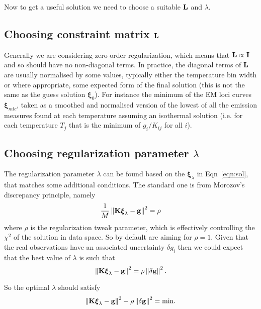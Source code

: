 \documentclass[12pt,a4paper]{article}
\begin{document}
Now to get a useful solution we need to choose a suitable ${\bf L}$ and $\lambda$.

\newpage
\vspace{-10pt}
\subsection*{Choosing constraint matrix ${\bf L}$}

Generally we are considering zero order regularization, which means that ${\bf L} \propto {\bf I}$ and so should have no non-diagonal terms. In practice, the diagonal terms of ${\bf L}$ are usually normalised by some values, typically either the temperature bin width or where appropriate, some expected form of the final solution (this is not the same as the guess solution $\boldsymbol{\xi}_0$). For instance the minimum of the EM loci curves $\boldsymbol{\xi}_{mlc}$, taken as a smoothed and normalised version of the lowest of all the emission measures found at each temperature assuming an isothermal solution (i.e. for each temperature $T_j$ that is the minimum of $g_i/K_{ij}$ for all $i$).


\vspace{-10pt}
\subsection*{Choosing regularization parameter $\lambda$}

The regularization parameter $\lambda$ can be found based on the $\boldsymbol{\xi}_\lambda$ in Eqn~\ref{eqn:sol}, that matches some additional conditions. The standard one is from Morozov's discrepancy principle, namely
\begin{equation}
    \frac{1}{M}\left\|\bf{K\boldsymbol{\xi}_\lambda-g}\right\|^2  =  \rho
\end{equation}
where $\rho$ is the regularization tweak parameter, which is effectively controlling the $\chi^2$ of the solution in data space. So by default are aiming for $\rho=1$. Given that the real observations have an associated uncertainty $\delta g_i$ then we could expect that the best value of $\lambda$ is such that 
\begin{equation}
    \left\|\bf{K\boldsymbol{\xi}_\lambda-g}\right\|^2  =  \rho \left\| {\bf \delta g}\right\|^2 .
\end{equation}

So the optimal $\lambda$ should satisfy 
\begin{equation}\label{eqn:desc}
    \left\|\bf{K\boldsymbol{\xi}_\lambda-g}\right\|^2  -  \rho \left\| {\bf \delta g}\right\|^2 = \mathrm{min}.
\end{equation}
\end{document}
